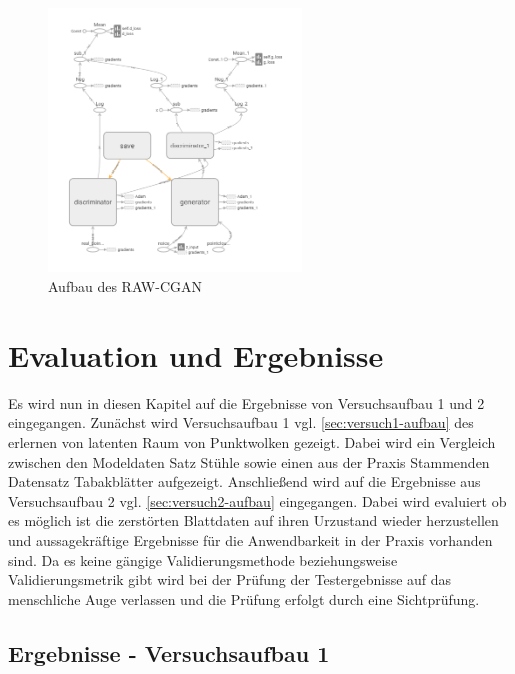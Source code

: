 \documentclass{llncs}
\begin{document}
\begin{figure}[htbp] 
	\centering
	\includegraphics[width=0.6\textwidth]{point-cgan.png}
	\caption{Aufbau des RAW-CGAN}
	\label{fig:Bild55}
\end{figure}
\newpage

\section{Evaluation und Ergebnisse}

Es wird nun in diesen Kapitel auf die Ergebnisse von Versuchsaufbau 1 und 2 eingegangen. Zunächst wird Versuchsaufbau 1 vgl. \ref{sec:versuch1-aufbau} des erlernen von latenten Raum von Punktwolken gezeigt. Dabei wird ein Vergleich zwischen den Modeldaten Satz Stühle sowie einen aus der Praxis Stammenden Datensatz Tabakblätter aufgezeigt. Anschließend wird auf die Ergebnisse aus Versuchsaufbau 2 vgl. \ref{sec:versuch2-aufbau} eingegangen. Dabei wird evaluiert ob es möglich ist die zerstörten Blattdaten auf ihren Urzustand wieder herzustellen und aussagekräftige Ergebnisse für die Anwendbarkeit in der Praxis vorhanden sind. Da es keine gängige Validierungsmethode beziehungsweise Validierungsmetrik gibt wird bei der Prüfung der Testergebnisse auf das menschliche Auge verlassen und die Prüfung erfolgt durch eine Sichtprüfung.  

\subsection{Ergebnisse - Versuchsaufbau 1}
\end{document}
